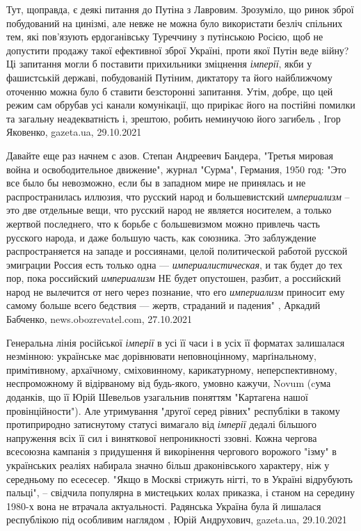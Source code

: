 Тут, щоправда, є деякі питання до Путіна з Лавровим. Зрозуміло, що ринок зброї
побудований на цинізмі, але невже не можна було використати безліч спільних
тем, які пов'язують ердоганівську Туреччину з путінською Росією, щоб не
допустити продажу такої ефективної зброї Україні, проти якої Путін веде війну?
Ці запитання могли б поставити прихильники зміцнення \emph{імперії}, якби у
фашистській державі, побудованій Путіним, диктатору та його найближчому
оточенню можна було б ставити безсторонні запитання. Утім, добре, що цей режим
сам обрубав усі канали комунікації, що прирікає його на постійні помилки та
загальну неадекватність і, зрештою, робить неминучою його загибель
, 
Ігор Яковенко, gazeta.ua, 29.10.2021

Давайте еще раз начнем с азов. Степан Андреевич Бандера, "Третья мировая война
и освободительное движение", журнал "Сурма", Германия, 1950 год: "Это все было
бы невозможно, если бы в западном мире не принялась и не распространилась
иллюзия, что русский народ и большевистский \emph{империализм} – это две отдельные
вещи, что русский народ не является носителем, а только жертвой последнего, что
к борьбе с большевизмом можно привлечь часть русского народа, и даже большую
часть, как союзника. Это заблуждение распространяется на западе и россиянами,
целой политической работой русской эмиграции Россия есть только одна —
\emph{империалистическая}, и так будет до тех пор, пока российский \emph{империализм} НЕ
будет опустошен, разбит, а российский народ не вылечится от него через
познание, что его \emph{империализм} приносит ему самому больше всего бедствия —
жертв, страданий и падения"
, 
Аркадий Бабченко, news.obozrevatel.com, 27.10.2021

Генеральна лінія російської \emph{імперії} в усі її часи і в усіх її форматах
залишалася незмінною: українське має дорівнювати неповноцінному, марґінальному,
примітивному, архаїчному, сміховинному, карикатурному, неперспективному,
неспроможному й відірваному від будь-якого, умовно кажучи, Novum (cума
доданків, що її Юрій Шевельов узагальнив поняттям "Картагена нашої
провінційности"). Але утримування "другої серед рівних" республіки в такому
протиприродно затиснутому статусі вимагало від \emph{імперії} дедалі більшого
напруження всіх її сил і виняткової непроникності ззовні. Кожна чергова
всесоюзна кампанія з придушення й викорінення чергового ворожого "ізму" в
українських реаліях набирала значно більш драконівського характеру, ніж у
середньому по есесесер. "Якщо в Москві стрижуть нігті, то в Україні відрубують
пальці", – свідчила популярна в мистецьких колах приказка, і станом на середину
1980-х вона не втрачала актуальності. Радянська Україна була й лишалася
республікою під особливим наглядом
, 
Юрій Андрухович, gazeta.ua, 29.10.2021

